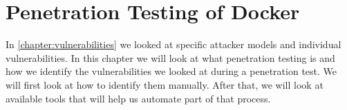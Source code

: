 \chapter{Penetration Testing of Docker}\label{chapter:pentesting}
In \autoref{chapter:vulnerabilities} we looked at specific attacker models and individual vulnerabilities. In this chapter we will look at what penetration testing is and how we identify the vulnerabilities we looked at during a penetration test. We will first look at how to identify them manually. After that, we will look at available tools that will help us automate part of that process.



